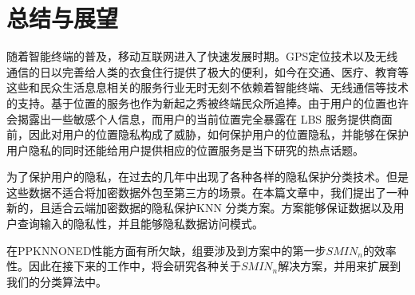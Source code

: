 \chapter{总结与展望}

随着智能终端的普及，移动互联网进入了快速发展时期。GPS定位技术以及无线通信的日以完善给人类的衣食住行提供了极大的便利，如今在交通、医疗、教育等这些和民众生活息息相关的服务行业无时无刻不依赖着智能终端、无线通信等技术的支持。基于位置的服务也作为新起之秀被终端民众所追捧。由于用户的位置也许会揭露出一些敏感个人信息，而用户的当前位置完全暴露在 LBS 服务提供商面前，因此对用户的位置隐私构成了威胁，如何保护用户的位置隐私，并能够在保护用户隐私的同时还能给用户提供相应的位置服务是当下研究的热点话题。

为了保护用户的隐私，在过去的几年中出现了各种各样的隐私保护分类技术。但是这些数据不适合将加密数据外包至第三方的场景。在本篇文章中，我们提出了一种新的，且适合云端加密数据的隐私保护KNN 分类方案。方案能够保证数据以及用户查询输入的隐私性，并且能够隐私数据访问模式。

在PPKNNONED性能方面有所欠缺，组要涉及到方案中的第一步$SMIN_n$的效率性。因此在接下来的工作中，将会研究各种关于$SMIN_n$解决方案，并用来扩展到我们的分类算法中。
